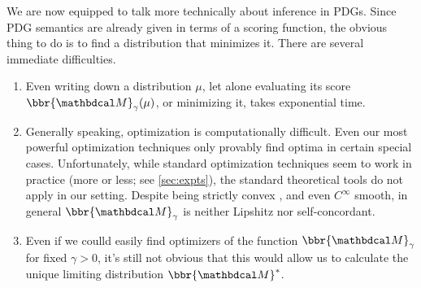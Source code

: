 \documentclass[twoside]{article}
\begin{document}
We are now equipped to talk more technically about inference in PDGs. 
Since PDG semantics are already given in terms of a scoring function,
the obvious thing to do is to find a distribution that minimizes it. 
There are several immediate difficulties.


\begin{enumerate}[nosep, label=\textbf{D\arabic*.}]
    \item Even writing down a distribution $\mu$, let alone evaluating its score $\bbr{\dg M}_\gamma (\mu)$, or minimizing it, takes exponential time.
    
    \item Generally speaking, optimization is computationally difficult.
        Even our most powerful optimization techniques only provably find optima in certain special cases.
    Unfortunately, while standard optimization techniques seem to work in practice
%
      (more or less; see \cref{sec:expts}), the standard theoretical
      tools do not apply in our setting.  
      Despite being strictly convex \parencite{pdg-aaai},
        and even $C^\infty$ smooth, 
        in general $\bbr{\dg M}_\gamma$ is neither Lipshitz nor self-concordant.
            
    \item Even if we coulld easily find optimizers of the function $\bbr{\dg M}_\gamma$ for fixed $\gamma > 0$, it's still not obvious that this would allow us to calculate the unique limiting distribution $\bbr{\dg M}^*$.
\end{enumerate}
\end{document}
